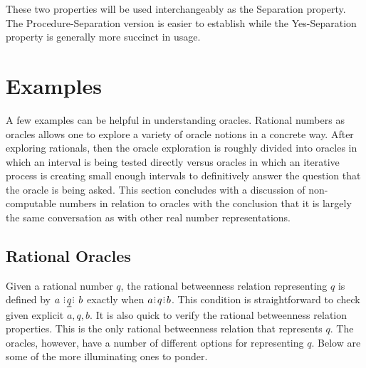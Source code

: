 \documentclass[12pt]{article}
\begin{document}
These two properties will be used interchangeably as the Separation property. The Procedure-Separation version is easier to establish while the Yes-Separation property is generally more succinct in usage. 


\section{Examples}

A few examples can be helpful in understanding oracles. Rational numbers as oracles allows one to explore a variety of oracle notions in a concrete way. After exploring rationals, then the oracle exploration is roughly divided into oracles in which an interval is being tested directly versus oracles in which an iterative process is creating small enough intervals to definitively answer the question that the oracle is being asked. This section concludes with a discussion of non-computable numbers in relation to oracles with the conclusion that it is largely the same conversation as with other real number representations. 

\subsection{Rational Oracles}

Given a rational number $q$, the rational betweenness relation representing $q$ is defined by $a \xrel[q] b$ exactly when $a \rint q \rint b$. This condition is straightforward to check given explicit $a, q, b$. It is also quick to verify the rational betweenness relation properties. This is the only rational betweenness relation that represents $q$. The oracles, however, have a number of different options for representing $q$. Below are some of the more illuminating ones to ponder. 
\end{document}
